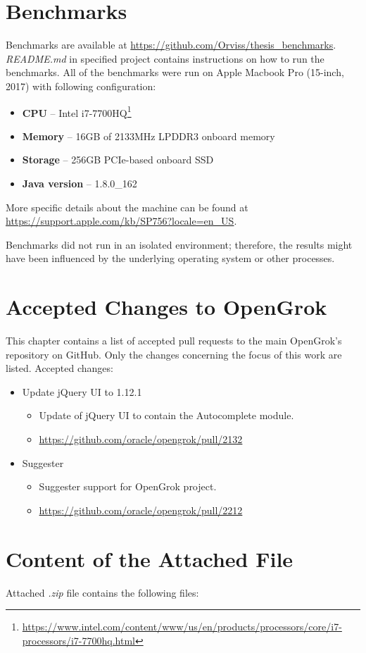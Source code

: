 \chapter{Benchmarks}
\label{benchmark_attachment}

Benchmarks are available at \url{https://github.com/Orviss/thesis_benchmarks}. \textit{README.md} in specified project
contains instructions on how to run the benchmarks. All of the benchmarks were run on Apple Macbook Pro (15-inch, 2017)
with following configuration:
\begin{itemize}
    \item \textbf{CPU} – Intel i7-7700HQ\footnote{\url{https://www.intel.com/content/www/us/en/products/processors/core/i7-processors/i7-7700hq.html}}
    \item \textbf{Memory} – 16GB of 2133MHz LPDDR3 onboard memory
    \item \textbf{Storage} – 256GB PCIe-based onboard SSD
    \item \textbf{Java version} – 1.8.0\_162
\end{itemize}

More specific details about the machine can be found at \url{https://support.apple.com/kb/SP756?locale=en_US}.

Benchmarks did not run in an isolated environment; therefore, the results might have been influenced by the underlying
operating system or other processes.

\chapter{Accepted Changes to OpenGrok}
This chapter contains a list of accepted pull requests to the main OpenGrok's repository on GitHub. Only the changes
concerning the focus of this work are listed.
Accepted changes:
\begin{itemize}
    \item Update jQuery UI to 1.12.1
    \begin{itemize}
        \item Update of jQuery UI to contain the Autocomplete module.
        \item \url{https://github.com/oracle/opengrok/pull/2132}
    \end{itemize}
    \item Suggester
    \begin{itemize}
        \item Suggester support for OpenGrok project.
        \item \url{https://github.com/oracle/opengrok/pull/2212}
    \end{itemize}
\end{itemize}

\chapter{Content of the Attached File}
Attached \textit{.zip} file contains the following files:
\bigskip
{}
